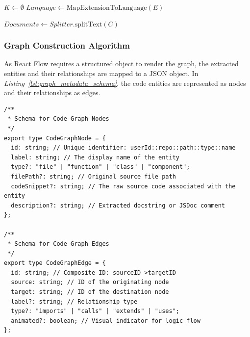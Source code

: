 \begin{algorithm}[H]
\SetAlgoLined
\DontPrintSemicolon
{}

$K \gets \emptyset$\;
$Language \gets \text{MapExtensionToLanguage}(E)$\;


$Documents \gets Splitter.\text{splitText}(C)$\;


\;
\caption{\textit{Language-Aware Recursive Code Splitting Algorithm}}
\label{alg:recursive_splitting}
\end{algorithm}

\subsubsection{Graph Construction Algorithm}
As React Flow requires a structured object to render the graph, the extracted entities and their relationships are mapped to a JSON object. In \textit{Listing~\ref{lst:graph_metadata_schema}}, the code entities are represented as nodes and their relationships as edges. 
\begin{listing}[H]
\begin{verbatim}
/**
 * Schema for Code Graph Nodes
 */
export type CodeGraphNode = {
  id: string; // Unique identifier: userId::repo::path::type::name
  label: string; // The display name of the entity
  type?: "file" | "function" | "class" | "component"; 
  filePath?: string; // Original source file path
  codeSnippet?: string; // The raw source code associated with the entity
  description?: string; // Extracted docstring or JSDoc comment
};

/**
 * Schema for Code Graph Edges
 */
export type CodeGraphEdge = {
  id: string; // Composite ID: sourceID->targetID
  source: string; // ID of the originating node
  target: string; // ID of the destination node
  label?: string; // Relationship type
  type?: "imports" | "calls" | "extends" | "uses";
  animated?: boolean; // Visual indicator for logic flow
};
\end{verbatim}
\caption{\textit{TypeScript interfaces for CodeOrient graph entities.}}
\label{lst:graph_metadata_schema}
\end{listing}

